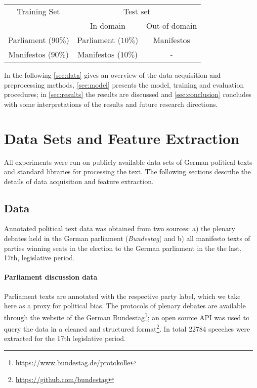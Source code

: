 \documentclass[11pt]{article}
\begin{document}
\begin{table}[t]\label{tab:classification_settings}
\footnotesize
\begin{tabular}{ccc}
Training Set & \multicolumn{2}{c}{Test set} \\
& In-domain&Out-of-domain\\
\hline
\hline
Parliament ($90\%$) & Parliament ($10\%$)& Manifestos\\
Manifestos ($90\%$)& Manifestos ($10\%$) & -\\
\end{tabular}
\end{table}

In the following \autoref{sec:data} gives an overview of the data acquisition and preprocessing methods, \autoref{sec:model} presents the model, training and evaluation procedures; in \autoref{sec:results} the results are discussed and \autoref{sec:conclusion} concludes with some interpretations of the results and future research directions.

\section{Data Sets and Feature Extraction}\label{sec:data}
%
All experiments were run on publicly available data sets of German political texts and standard libraries for processing the text. The following sections describe the details of data acquisition and feature extraction.

\subsection{Data}
Annotated political text data was obtained from two sources: a) the plenary debates held in the German parliament ({\em Bundestag}) and b) all manifesto texts of parties winning seats in the election to the German parliament in the the last, 17th, legislative period. 


\paragraph{Parliament discussion data} Parliament texts are annotated with the respective party label, which we take here as a proxy for political bias. The protocols of plenary debates are available through the website of the German Bundestag\footnote{\url{https://www.bundestag.de/protokolle}}; an open source API was used to query the data in a cleaned and structured format\footnote{\url{https://github.com/bundestag}}. In total 22784 speeches were extracted for the 17th legislative period.
\end{document}
